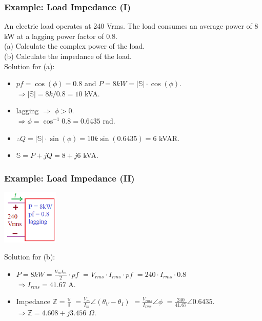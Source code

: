 \documentclass{beamer}
\begin{document}


\begin{frame}[fragile]
\frametitle{Example: Load Impedance (I)}

An electric load operates at 240 Vrms. The load consumes an average power of 8 kW at a lagging power factor of 0.8.
\\
(a) Calculate the complex power of the load.
\\
(b) Calculate the impedance of the load.
\\

Solution for (a):
\begin{itemize}
\item $pf = \cos(\phi) = 0.8$ and
$P = 8kW = |\mathbb{S}| \cdot \cos(\phi)$.
\\
$\Rightarrow |\mathbb{S}| = 8k/0.8 = 10$ kVA.
\item lagging $\Rightarrow$ $\phi > 0$.
\\
$\Rightarrow \phi = \cos^{-1} 0.8 = 0.6435$ rad.
\item $\therefore Q = |\mathbb{S}| \cdot \sin(\phi) = 10k \sin(0.6435) = 6$ kVAR.
\item $\mathbb{S} = P + jQ = 8 + j6$ kVA. 
\end{itemize}

\end{frame}




\begin{frame}[fragile]
\frametitle{Example: Load Impedance (II)}

\begin{center}
\includegraphics[width=0.2\textwidth]{src/pf_impedance.png}
\end{center}


Solution for (b):
\begin{itemize}
\item $P = 8kW = \frac{V_m I_m}{2} \cdot pf$
$= V_{rms} \cdot I_{rms} \cdot pf$
$= 240 \cdot I_{rms} \cdot 0.8$
\\ $\Rightarrow I_{rms} = 41.67$ A.
\item Impedance $\mathbb{Z} = \frac{\mathbb{V}}{\mathbb{I}}$
$= \frac{V_m}{I_m} \angle (\theta_V - \theta_I)$
$= \frac{V_{rms}}{I_{rms}} \angle \phi$
$= \frac{240}{41.67} \angle 0.6435$.
\\
$\Rightarrow \mathbb{Z} =  4.608 + j3.456$ $\Omega$.

\end{itemize}

\end{frame}
\end{document}
